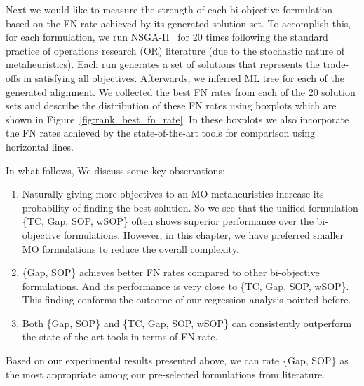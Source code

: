

Next we would like to measure the strength of each bi-objective formulation based on the FN rate achieved by its generated solution set. To accomplish this, for each formulation, we run NSGA-II~\citep{deb2002fast} for 20 times following the standard practice of operations research (OR) literature (due to the stochastic nature of metaheuristics). Each run generates a set of solutions that represents the trade-offs in satisfying all objectives. Afterwards, we inferred ML tree for each of the generated alignment. We collected the best FN rates from each of the 20 solution sets and describe the distribution of these FN rates using boxplots which are shown in Figure~\ref{fig:rank_best_fn_rate}. In these boxplots we also incorporate the FN rates achieved by the state-of-the-art tools for comparison using horizontal lines.

In what follows, We discuss some key observations:
\begin{enumerate}
	\item Naturally giving more objectives to an MO metaheuristics increase its probability of finding the best solution. So we see that the unified formulation \{TC, Gap, SOP, wSOP\} often shows superior performance over the bi-objective formulations. However, in this chapter, we have preferred smaller MO formulations to reduce the overall complexity.
\item \{Gap, SOP\} achieves better FN rates compared to other bi-objective formulations. And its performance is very close to \{TC, Gap, SOP, wSOP\}. This finding conforms the outcome of our regression analysis pointed before.
	\item Both \{Gap, SOP\} and \{TC, Gap, SOP, wSOP\} can consistently outperform the state of the art tools in terms of FN rate.
\end{enumerate}
Based on our experimental results presented above, we can rate \{Gap, SOP\} as the most appropriate among our pre-selected formulations from literature. 

